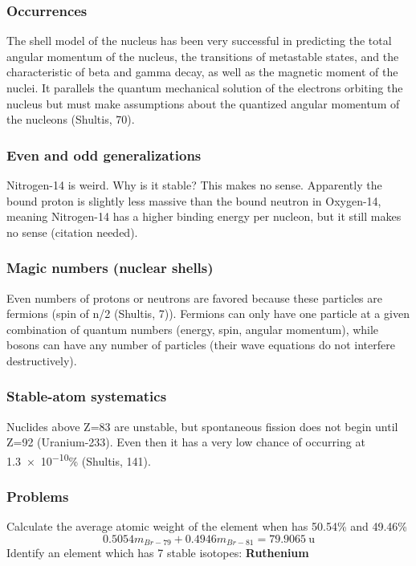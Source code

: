\documentclass{article}
\begin{document}
\subsubsection{Occurrences}
The shell model of the nucleus has been very successful in predicting the total angular momentum of the nucleus, the transitions of metastable states, and the characteristic of beta and gamma decay, as well as the magnetic moment of the nuclei. It parallels the quantum mechanical solution of the electrons orbiting the nucleus but must make assumptions about the quantized angular momentum of the nucleons (Shultis, 70).

\subsubsection{Even and odd generalizations}
Nitrogen-14 is weird. Why is it stable? This makes no sense. Apparently the bound proton is slightly less massive than the bound neutron in Oxygen-14, meaning Nitrogen-14 has a higher binding energy per nucleon, but it still makes no sense (citation needed). 

\subsubsection{Magic numbers (nuclear shells)}
Even numbers of protons or neutrons are favored because these particles are fermions (spin of n/2 (Shultis, 7)). Fermions can only have one particle at a given combination of quantum numbers (energy, spin, angular momentum), while bosons can have any number of particles (their wave equations do not interfere destructively).

\subsubsection{Stable-atom systematics}
Nuclides above Z=83 are unstable, but spontaneous fission does not begin until Z=92 (Uranium-233). Even then it has a very low chance of occurring at \num{1.3e-10}\% (Shultis, 141).

\subsubsection{Problems}
Calculate the average atomic weight of the element when  has 50.54\%  and 49.46\% 
$$ 0.5054 m_{Br-79} + 0.4946 m_{Br-81} = \SI{79.9065}{\amu}
$$
Identify an element which has 7 stable isotopes: \textbf{Ruthenium}
\end{document}
